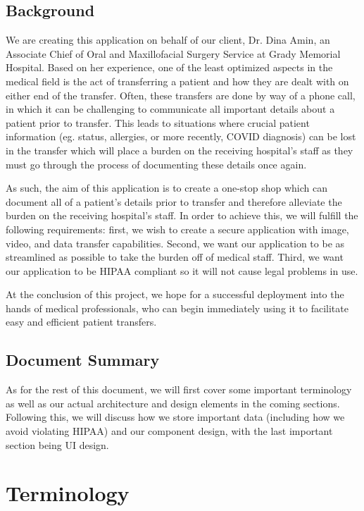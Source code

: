 \documentclass[11pt,letterpaper]{article}
\begin{document}
\subsection{Background}
We are creating this application on behalf of our client, Dr. Dina Amin, an Associate Chief of Oral and Maxillofacial Surgery Service at Grady Memorial Hospital. Based on her experience, one of the least optimized aspects in the medical field is the act of transferring a patient and how they are dealt with on either end of the transfer. Often, these transfers are done by way of a phone call, in which it can be challenging to communicate all important details about a patient prior to transfer. This leads to situations where crucial patient information (eg. status, allergies, or more recently, COVID diagnosis) can be lost in the transfer which will place a burden on the receiving hospital's staff as they must go through the process of documenting these details once again. 

As such, the aim of this application is to create a one-stop shop which can document all of a patient's details prior to transfer and therefore alleviate the burden on the receiving hospital's staff. In order to achieve this, we will fulfill the following requirements: first, we wish to create a secure application with image, video, and data transfer capabilities. Second, we want our application to be as streamlined as possible to take the burden off of medical staff. Third, we want our application to be HIPAA compliant so it will not cause legal problems in use.  

At the conclusion of this project, we hope for a successful deployment into the hands of medical professionals, who can begin immediately using it to facilitate easy and efficient patient transfers.

\subsection{Document Summary}
As for the rest of this document, we will first cover some important terminology as well as our actual architecture and design elements in the coming sections. Following this, we will discuss how we store important data (including how we avoid violating HIPAA) and our component design, with the last important section being UI design.

\section{Terminology}
\end{document}

